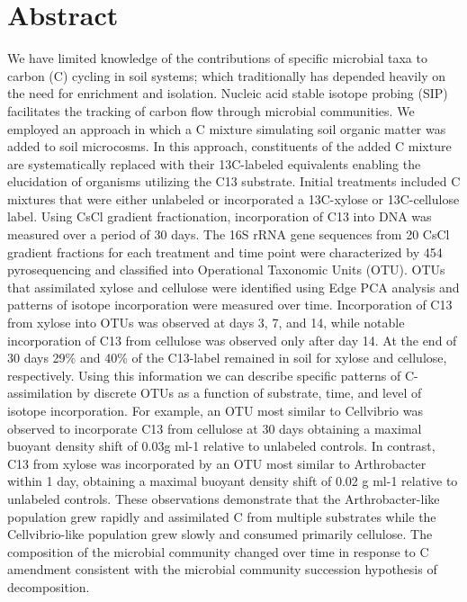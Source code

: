 \section{Abstract} 
We have limited knowledge of the contributions of specific microbial taxa to carbon (C) cycling in soil systems; which traditionally has depended heavily on the need for enrichment and isolation. Nucleic acid stable isotope probing (SIP) facilitates the tracking of carbon flow through microbial communities. We employed an approach in which a C mixture simulating soil organic matter was added to soil microcosms. In this approach, constituents of the added C mixture are systematically replaced with their 13C-labeled equivalents enabling the elucidation of organisms utilizing the C13 substrate. Initial treatments included C mixtures that were either unlabeled or incorporated a 13C-xylose or 13C-cellulose label.  Using CsCl gradient fractionation, incorporation of C13 into DNA was measured over a period of 30 days. The 16S rRNA gene sequences from 20 CsCl gradient fractions for each treatment and time point were characterized by 454 pyrosequencing and classified into Operational Taxonomic Units (OTU).  OTUs that assimilated xylose and cellulose were identified using Edge PCA analysis and patterns of isotope incorporation were measured over time. Incorporation of C13 from xylose into OTUs was observed at days 3, 7, and 14, while notable incorporation of C13 from cellulose was observed only after day 14. At the end of 30 days 29\% and 40\% of the C13-label remained in soil for xylose and cellulose, respectively.  Using this information we can describe specific patterns of C-assimilation by discrete OTUs as a function of substrate, time, and level of isotope incorporation. For example, an OTU most similar to Cellvibrio was observed to incorporate C13 from cellulose at 30 days obtaining a maximal buoyant density shift of 0.03g ml-1 relative to unlabeled controls. In contrast, C13 from xylose was incorporated by an OTU most similar to Arthrobacter within 1 day, obtaining a maximal buoyant density shift of 0.02 g ml-1 relative to unlabeled controls.  These observations demonstrate that the Arthrobacter-like population grew rapidly and assimilated C from multiple substrates while the Cellvibrio-like population grew slowly and consumed primarily cellulose.  The composition of the microbial community changed over time in response to C amendment consistent with the microbial community succession hypothesis of decomposition. 